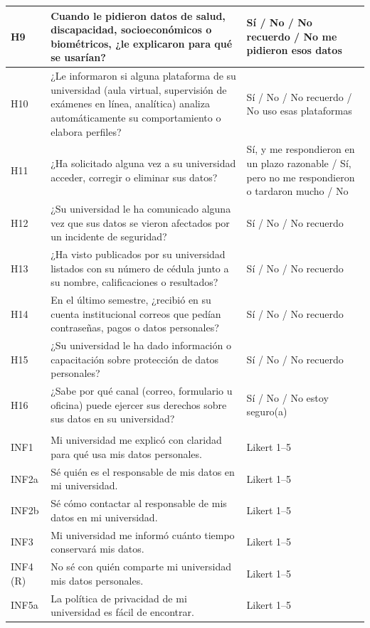 {\begin{xltabular}{\textwidth}{|>{\raggedright\arraybackslash}p{1.1cm}|>{\raggedright\arraybackslash}X|>{\raggedright\arraybackslash}p{4.6cm}|}
  H9 & Cuando le pidieron datos de salud, discapacidad, socioeconómicos o biométricos, ¿le explicaron para qué se usarían? & Sí / No / No recuerdo / No me pidieron esos datos \\ \hline
  H10 & ¿Le informaron si alguna plataforma de su universidad (aula virtual, supervisión de exámenes en línea, analítica) analiza automáticamente su comportamiento o elabora perfiles? & Sí / No / No recuerdo / No uso esas plataformas \\ \hline
  H11 & ¿Ha solicitado alguna vez a su universidad acceder, corregir o eliminar sus datos? & Sí, y me respondieron en un plazo razonable / Sí, pero no me respondieron o tardaron mucho / No \\ \hline
  H12 & ¿Su universidad le ha comunicado alguna vez que sus datos se vieron afectados por un incidente de seguridad? & Sí / No / No recuerdo \\ \hline
  H13 & ¿Ha visto publicados por su universidad listados con su número de cédula junto a su nombre, calificaciones o resultados? & Sí / No / No recuerdo \\ \hline
  H14 & En el último semestre, ¿recibió en su cuenta institucional correos que pedían contraseñas, pagos o datos personales? & Sí / No / No recuerdo \\ \hline
  H15 & ¿Su universidad le ha dado información o capacitación sobre protección de datos personales? & Sí / No / No recuerdo \\ \hline
  H16 & ¿Sabe por qué canal (correo, formulario u oficina) puede ejercer sus derechos sobre sus datos en su universidad? & Sí / No / No estoy seguro(a) \\ \hline
   \\ \hline
  INF1 & Mi universidad me explicó con claridad para qué usa mis datos personales. & Likert 1--5 \\ \hline
  INF2a & Sé quién es el responsable de mis datos en mi universidad. & Likert 1--5 \\ \hline
  INF2b & Sé cómo contactar al responsable de mis datos en mi universidad. & Likert 1--5 \\ \hline
  INF3 & Mi universidad me informó cuánto tiempo conservará mis datos. & Likert 1--5 \\ \hline
  INF4 (R) & No sé con quién comparte mi universidad mis datos personales. & Likert 1--5 \\ \hline
  INF5a & La política de privacidad de mi universidad es fácil de encontrar. & Likert 1--5 \\ \hline

\end{xltabular}}

